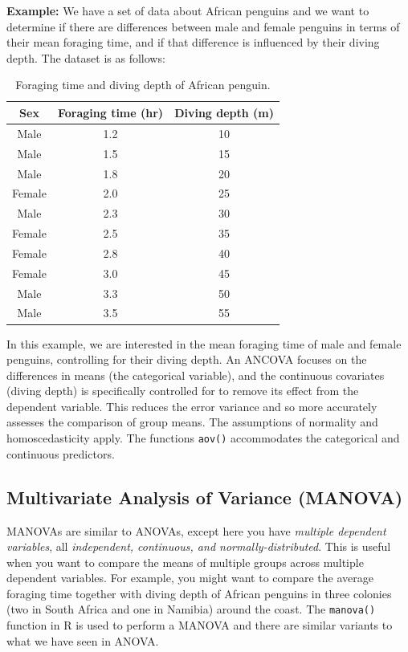 \documentclass[
  letterpaper,
]{book}
\begin{document}
\textbf{Example:} We have a set of data about African penguins and we
want to determine if there are differences between male and female
penguins in terms of their mean foraging time, and if that difference is
influenced by their diving depth. The dataset is as follows:

\begin{table}
\centering
\caption{Foraging time and diving depth of African penguin.}
\centering
\begin{tabular}[t]{ccc}
\toprule
Sex & Foraging time
(hr) & Diving depth
(m)\\
\midrule
Male & 1.2 & 10\\
Male & 1.5 & 15\\
Male & 1.8 & 20\\
Female & 2.0 & 25\\
Male & 2.3 & 30\\
\addlinespace
Female & 2.5 & 35\\
Female & 2.8 & 40\\
Female & 3.0 & 45\\
Male & 3.3 & 50\\
Male & 3.5 & 55\\
\bottomrule
\end{tabular}
\end{table}

In this example, we are interested in the mean foraging time of male and
female penguins, controlling for their diving depth. An ANCOVA focuses
on the differences in means (the categorical variable), and the
continuous covariates (diving depth) is specifically controlled for to
remove its effect from the dependent variable. This reduces the error
variance and so more accurately assesses the comparison of group means.
The assumptions of normality and homoscedasticity apply. The functions
\texttt{aov()} accommodates the categorical and continuous predictors.

\subsection{Multivariate Analysis of Variance
(MANOVA)}\label{multivariate-analysis-of-variance-manova}

MANOVAs are similar to ANOVAs, except here you have \emph{multiple
dependent variables}, all \emph{independent, continuous, and
normally-distributed}. This is useful when you want to compare the means
of multiple groups across multiple dependent variables. For example, you
might want to compare the average foraging time together with diving
depth of African penguins in three colonies (two in South Africa and one
in Namibia) around the coast. The \texttt{manova()} function in R is
used to perform a MANOVA and there are similar variants to what we have
seen in ANOVA.
\end{document}
